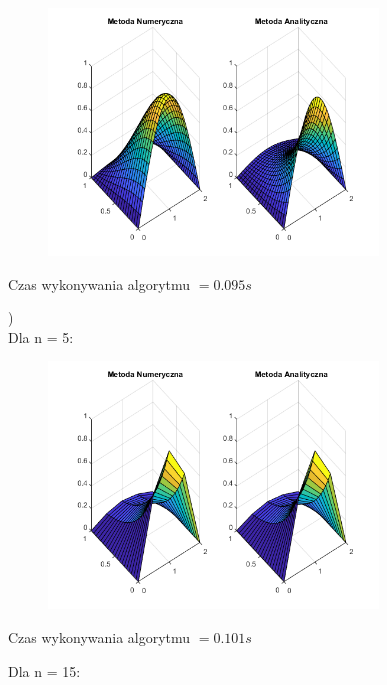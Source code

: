 \begin{figure}[!ht]
	\begin{center}
		\includegraphics[width=0.78\textwidth]{Lab7/charts/df/30_k.png}
	\end{center}
\end{figure}

Czas wykonywania algorytmu $ = 0.095 s$

\FloatBarrier
{})\\

Dla n = 5:

\begin{figure}[!ht]
	\begin{center}
		\includegraphics[width=0.78\textwidth]{Lab7/charts/df/5_2.png}
	\end{center}
\end{figure}

Czas wykonywania algorytmu $ = 0.101 s$

Dla n = 15:

